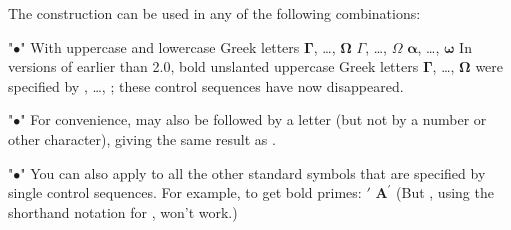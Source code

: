 \medskip
The  construction can be used in any of the following
combinations:
\roster
\item"$\bullet$" With uppercase and lowercase Greek letters
\beginexample{\exboxwidth=3.75in}
        $\boldsymbol\Gamma$, \dots, $\boldsymbol\Omega$
        $\boldsymbol\varGamma$, \dots, $\boldsymbol\varOmega$
        $\boldsymbol\alpha$, \dots, $\boldsymbol\omega$
\endexample
\noindent
In versions of \AmSTeX{} earlier than 2.0, bold unslanted uppercase
Greek letters $\boldsymbol\Gamma$, \dots, $\boldsymbol\Omega$ were
specified by , \dots, ; these control
sequences have now disappeared. 

\medskip
\item"$\bullet$"
For convenience,  may also be followed by a letter (but
not by a number or other character), giving the same result as
.
  
\medskip
\item"$\bullet$"
You can also apply  to all the other standard symbols that
are specified by single control sequences. For example, to get bold primes:
\beginexample{\exboxwidth=3.75in}
\exbox{}{\$\\boldsymbol\\prime\$} $\boldsymbol\prime$
        $\boldsymbol A^{\boldsymbol\prime}$
\endexample
\noindent
(But , using the shorthand notation for ,
won't work.)

